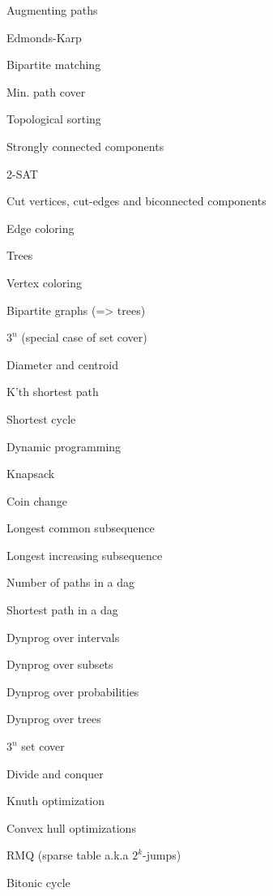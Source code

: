 \begin{myitemize}
\begin{myitemize}
\begin{myitemize}
		\item Augmenting paths
		\item Edmonds-Karp
	\end{myitemize}
	\item Bipartite matching
	\item Min. path cover
	\item Topological sorting
	\item Strongly connected components
	\item 2-SAT
	\item Cut vertices, cut-edges and biconnected components
	\item Edge coloring
	\begin{myitemize}
		\item Trees
	\end{myitemize}
	\item Vertex coloring
	\begin{myitemize}
		\item Bipartite graphs (=> trees)
		\item $3^n$ (special case of set cover)
	\end{myitemize}
	\item Diameter and centroid
	\item K'th shortest path
	\item Shortest cycle
\end{myitemize}
\item Dynamic programming
\begin{myitemize}
	\item Knapsack
	\item Coin change
	\item Longest common subsequence
	\item Longest increasing subsequence
	\item Number of paths in a dag
	\item Shortest path in a dag
	\item Dynprog over intervals
	\item Dynprog over subsets
	\item Dynprog over probabilities
	\item Dynprog over trees
	\item $3^n$ set cover
	\item Divide and conquer
	\item Knuth optimization
	\item Convex hull optimizations
	\item RMQ (sparse table a.k.a $2^k$-jumps)
	\item Bitonic cycle

\end{myitemize}
\end{myitemize}
